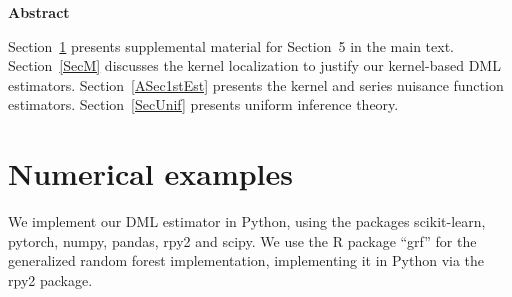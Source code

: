 \documentclass[lettersize, 12pt]{article}
\begin{document}
{\begin{center}
\end{center}


\begin{center}
{\bf \small Abstract}
\end{center}



Section~\ref{ASecMC} presents supplemental material for Section~5 in the main text.
Section~\ref{SecM} discusses the kernel localization to justify our kernel-based DML estimators.
Section~\ref{ASec1stEst} presents the kernel and series nuisance function  estimators.
Section~\ref{SecUnif} presents uniform inference theory.



\section{Numerical examples}
\label{ASecMC}

We implement  our DML estimator in Python, using the packages scikit-learn, pytorch, numpy, pandas, rpy2 and scipy. We use the R package ``grf'' for the generalized random forest implementation, implementing it in Python via the rpy2 package.





}
\end{document}
